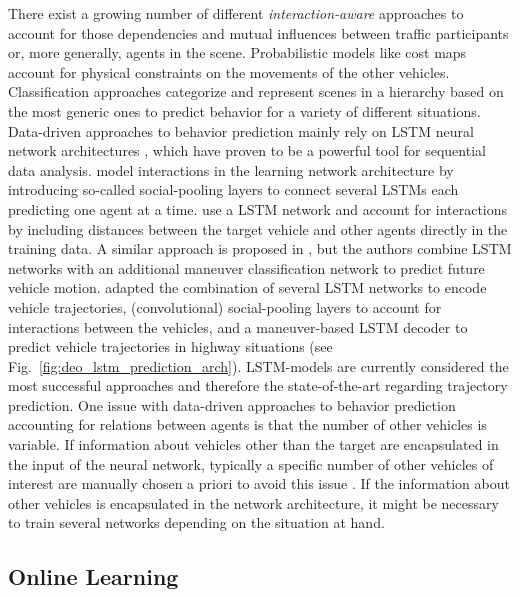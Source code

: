 There exist a growing number of different \emph{interaction-aware} approaches to account for those dependencies and mutual influences between traffic participants or, more generally, agents in the scene.
Probabilistic models like cost maps \parencite{Bahram2016} account for physical constraints on the movements of the other vehicles.
Classification approaches categorize and represent scenes in a hierarchy \parencite{Bonnin2012} based on the most generic ones to predict behavior for a variety of different situations.
Data-driven approaches to behavior prediction mainly rely on \ac{LSTM} neural network architectures \parencite{Hochreiter1997}, which have proven to be a powerful tool for sequential data analysis.
\textcite{Alahi2016} model interactions in the learning network architecture by introducing so-called social-pooling layers to connect several \acp{LSTM} each predicting one agent at a time.
\textcite{Altche2018} use a \ac{LSTM} network and account for interactions by including distances between the target vehicle and other agents directly in the training data.
A similar approach is proposed in \textcite{Deo2018}, but the authors combine \ac{LSTM} networks with an additional maneuver classification network to predict future vehicle motion.
\textcite{Deo2018a} adapted the combination of several \ac{LSTM} networks to encode vehicle trajectories, (convolutional) social-pooling layers to account for interactions between the vehicles, and a maneuver-based \ac{LSTM} decoder to predict vehicle trajectories in highway situations (see Fig.~\ref{fig:deo_lstm_prediction_arch}).
\ac{LSTM}-models are currently considered the most successful approaches and therefore the state-of-the-art regarding trajectory prediction.
One issue with data-driven approaches to behavior prediction accounting for relations between agents is that the number of other vehicles is variable.
If information about vehicles other than the target are encapsulated in the input of the neural network, typically a specific number of other vehicles of interest are manually chosen a priori to avoid this issue \parencite{Altche2018, Deo2018}.
If the information about other vehicles is encapsulated in the network architecture, it might be necessary to train several networks depending on the situation at hand.

\subsection{Online Learning}%
\label{subsec:online_learning}

